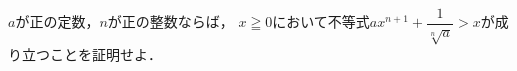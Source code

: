 \documentclass[../../main.tex]{subfiles}
\begin{document}
$a$が正の定数，$n$が正の整数ならば，
$x \geqq 0$において不等式$\displaystyle ax^{n+1}+\dfrac{1}{\sqrt[n]{a}}>x$が成り立つことを証明せよ．
\end{document}
